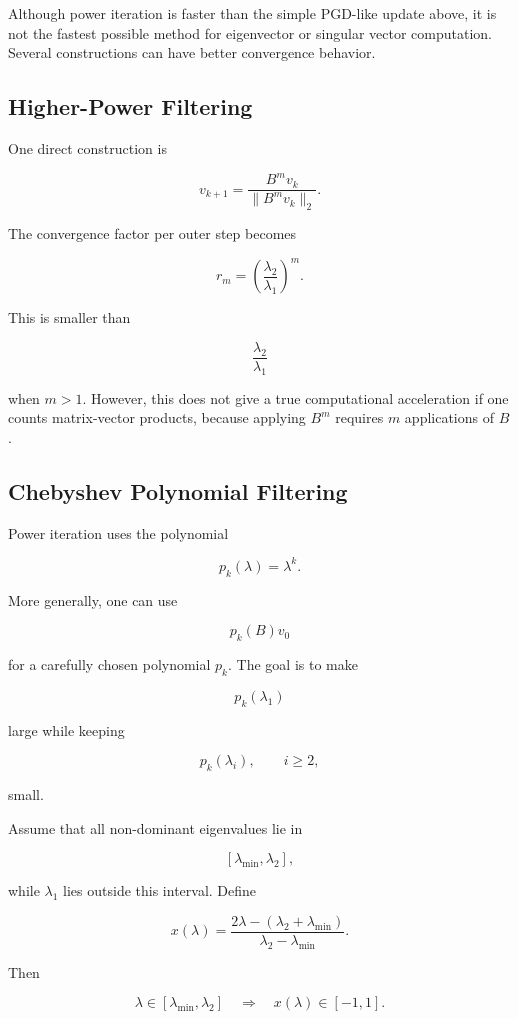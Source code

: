 \documentclass{article}
\begin{document}
Although power iteration is faster than the simple PGD-like update above, it is not the fastest possible method for eigenvector or singular vector computation. Several constructions can have better convergence behavior.

\subsection{Higher-Power Filtering}

One direct construction is

\[
v_{k+1}
=
\frac{B^m v_k}
{\|B^m v_k\|_2}.
\]

The convergence factor per outer step becomes

\[
r_m
=
\left(\frac{\lambda_2}{\lambda_1}\right)^m.
\]

This is smaller than

\[
\frac{\lambda_2}{\lambda_1}
\]

when \(m>1\). However, this does not give a true computational acceleration if one counts matrix-vector products, because applying \(B^m\) requires \(m\) applications of \(B\).

\subsection{Chebyshev Polynomial Filtering}

Power iteration uses the polynomial

\[
p_k(\lambda)=\lambda^k.
\]

More generally, one can use

\[
p_k(B)v_0
\]

for a carefully chosen polynomial \(p_k\). The goal is to make

\[
p_k(\lambda_1)
\]

large while keeping

\[
p_k(\lambda_i),\qquad i\ge 2,
\]

small.

Assume that all non-dominant eigenvalues lie in

\[
[\lambda_{\min},\lambda_2],
\]

while \(\lambda_1\) lies outside this interval. Define

\[
x(\lambda)
=
\frac{2\lambda-(\lambda_2+\lambda_{\min})}
{\lambda_2-\lambda_{\min}}.
\]

Then

\[
\lambda\in[\lambda_{\min},\lambda_2]
\quad\Longrightarrow\quad
x(\lambda)\in[-1,1].
\]
\end{document}
